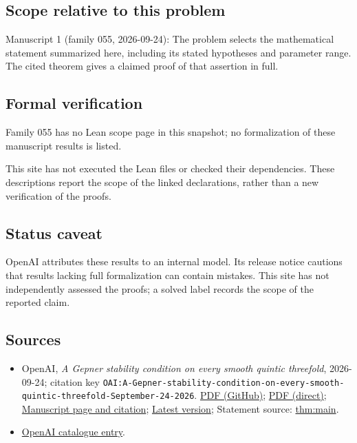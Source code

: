 \documentclass[11pt]{article}
\begin{document}
\subsection{Scope relative to this problem}
Manuscript 1 (family 055, 2026-09-24): The problem selects the mathematical statement summarized here, including its stated hypotheses and parameter range. The cited theorem gives a claimed proof of that assertion in full.

\subsection{Formal verification}
Family 055 has no Lean scope page in this snapshot; no formalization of these manuscript results is listed.

This site has not executed the Lean files or checked their dependencies. These descriptions report the scope of the linked declarations, rather than a new verification of the proofs.

\subsection{Status caveat}
OpenAI attributes these results to an internal model. Its release notice cautions that results lacking full formalization can contain mistakes. This site has not independently assessed the proofs; a solved label records the scope of the reported claim.

\subsection{Sources}
\begin{itemize}
\item OpenAI, \emph{A Gepner stability condition on every smooth quintic threefold}, 2026-09-24; citation key \texttt{OAI:A-Gepner-stability-condition-on-every-smooth-quintic-threefold-September-24-2026}. \href{https://github.com/openai/math/blob/adc7f1241b42e322a6451854ab7e4b4c146bf78a/preprints/A-Gepner-stability-condition-on-every-smooth-quintic-threefold-September-24-2026/paper.pdf}{PDF (GitHub)}; \href{https://github.com/openai/math/raw/adc7f1241b42e322a6451854ab7e4b4c146bf78a/preprints/A-Gepner-stability-condition-on-every-smooth-quintic-threefold-September-24-2026/paper.pdf}{PDF (direct)}; \href{https://github.com/openai/math/blob/adc7f1241b42e322a6451854ab7e4b4c146bf78a/preprints/A-Gepner-stability-condition-on-every-smooth-quintic-threefold-September-24-2026/README.md}{Manuscript page and citation}; \href{https://github.com/openai/math/blob/main/preprints/A-Gepner-stability-condition-on-every-smooth-quintic-threefold-September-24-2026/paper.pdf}{Latest version}; Statement source: \href{https://github.com/openai/math/blob/adc7f1241b42e322a6451854ab7e4b4c146bf78a/preprints/A-Gepner-stability-condition-on-every-smooth-quintic-threefold-September-24-2026/build/sections/introduction.tex\#L52}{thm:main}.
\item \href{https://github.com/openai/math/blob/adc7f1241b42e322a6451854ab7e4b4c146bf78a/CONTENTS.md}{OpenAI catalogue entry}.
\end{itemize}
\end{document}
